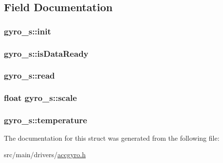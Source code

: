 \subsection{Field Documentation}
\hypertarget{structgyro__s_a2ad5bbee221adf921b327a639aef0dad}{
\subsubsection[{init}]{ gyro\+\_\+s\+::init}}\label{structgyro__s_a2ad5bbee221adf921b327a639aef0dad}
\hypertarget{structgyro__s_a35abd3db9c89e5471844c403853c12d6}{
\subsubsection[{is\+Data\+Ready}]{ gyro\+\_\+s\+::is\+Data\+Ready}}\label{structgyro__s_a35abd3db9c89e5471844c403853c12d6}
\hypertarget{structgyro__s_aa8ff06960a9450a62d6c4a980ac769f3}{
\subsubsection[{read}]{ gyro\+\_\+s\+::read}}\label{structgyro__s_aa8ff06960a9450a62d6c4a980ac769f3}
\hypertarget{structgyro__s_af2c9ddf3e57a6d34b0e990429e96c81d}{
\subsubsection[{scale}]{\setlength{\rightskip}{0pt plus 5cm}float gyro\+\_\+s\+::scale}}\label{structgyro__s_af2c9ddf3e57a6d34b0e990429e96c81d}
\hypertarget{structgyro__s_ada63f1d22989d555be8c9f1871f00054}{
\subsubsection[{temperature}]{ gyro\+\_\+s\+::temperature}}\label{structgyro__s_ada63f1d22989d555be8c9f1871f00054}


The documentation for this struct was generated from the following file\+:\begin{DoxyCompactItemize}
\item 
src/main/drivers/\hyperlink{accgyro_8h}{accgyro.\+h}\end{DoxyCompactItemize}

